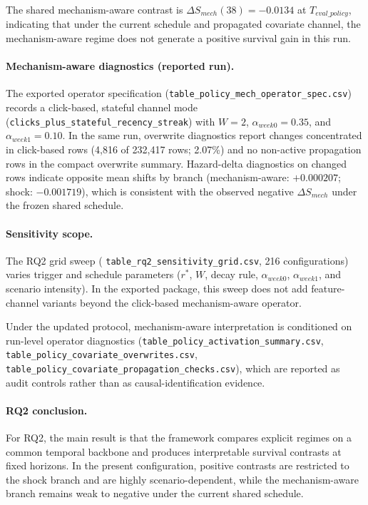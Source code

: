 The shared mechanism-aware contrast is $\Delta S_{mech}(38)=-0.0134$ at $T_{eval\_policy}$, indicating that under the current schedule and propagated covariate channel, the mechanism-aware regime does not generate a positive survival gain in this run.

\paragraph*{Mechanism-aware diagnostics (reported run).}
The exported operator specification (\texttt{table\_policy\_mech\_operator\_spec.csv}) records a click-based, stateful channel mode (\texttt{clicks\_plus\_stateful\_recency\_streak}) with $W=2$, $\alpha_{week0}=0.35$, and $\alpha_{week1}=0.10$. In the same run, overwrite diagnostics report changes concentrated in click-based rows (4{,}816 of 232{,}417 rows; 2.07\%) and no non-active propagation rows in the compact overwrite summary. Hazard-delta diagnostics on changed rows indicate opposite mean shifts by branch (mechanism-aware: $+0.000207$; shock: $-0.001719$), which is consistent with the observed negative $\Delta S_{mech}$ under the frozen shared schedule.

\paragraph*{Sensitivity scope.}
The RQ2 grid sweep (
\texttt{table\_rq2\_sensitivity\_grid.csv}, 216 configurations) varies trigger and schedule parameters ($r^*$, $W$, decay rule, $\alpha_{week0}$, $\alpha_{week1}$, and scenario intensity). In the exported package, this sweep does not add feature-channel variants beyond the click-based mechanism-aware operator.

Under the updated protocol, mechanism-aware interpretation is conditioned on run-level operator diagnostics (\texttt{table\_policy\_activation\_summary.csv}, \texttt{table\_policy\_covariate\_overwrites.csv}, \texttt{table\_policy\_covariate\_propagation\_checks.csv}), which are reported as audit controls rather than as causal-identification evidence.

\paragraph*{RQ2 conclusion.}
For RQ2, the main result is that the framework compares explicit regimes on a common temporal backbone and produces interpretable survival contrasts at fixed horizons. In the present configuration, positive contrasts are restricted to the shock branch and are highly scenario-dependent, while the mechanism-aware branch remains weak to negative under the current shared schedule.


